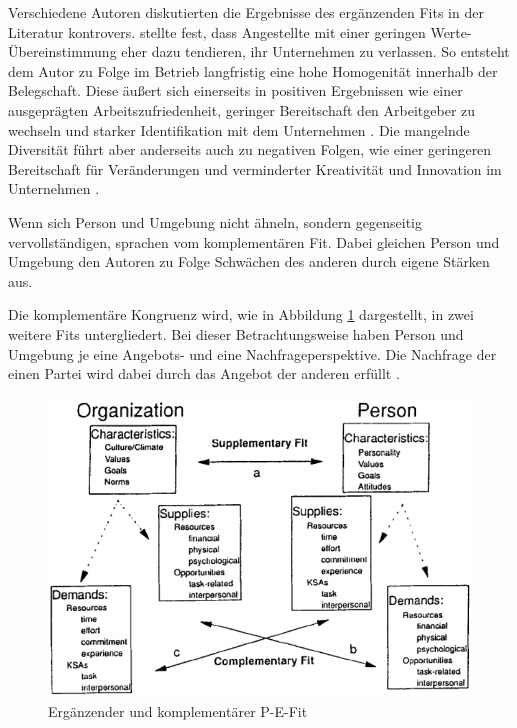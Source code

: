 Verschiedene Autoren diskutierten die Ergebnisse des ergänzenden Fits in der Literatur kontrovers. \textcite[S. 6]{schneider:1987} stellte fest, dass Angestellte mit einer geringen Werte-Übereinstimmung eher dazu tendieren, ihr Unternehmen zu verlassen. So entsteht dem Autor zu Folge im Betrieb langfristig eine hohe Homogenität innerhalb der Belegschaft. Diese äußert sich einerseits in positiven Ergebnissen wie einer ausgeprägten Arbeitszufriedenheit, geringer Bereitschaft den Arbeitgeber zu wechseln und starker Identifikation mit dem Unternehmen \cite[S. 25ff.]{kristof:1996}\cite[S. 5]{su:2015}. Die mangelnde Diversität führt aber anderseits auch zu negativen Folgen, wie einer geringeren Bereitschaft für Veränderungen \cite[S. 10]{schneider:1987} und verminderter Kreativität und Innovation im Unternehmen \cite[S. 7]{chatman:1998}.

Wenn sich Person und Umgebung nicht ähneln, sondern gegenseitig vervollständigen, sprachen \textcite[S. 4]{muchinsky:1987} vom komplementären Fit. Dabei gleichen Person und Umgebung den Autoren zu Folge Schwächen des anderen durch eigene Stärken aus.

Die komplementäre Kongruenz wird, wie in Abbildung \ref{fig:personEnvironmentFit:supplementaryUndComplementary:abb1} dargestellt, in zwei weitere Fits untergliedert. Bei dieser Betrachtungsweise haben Person und Umgebung je eine Angebots- und eine Nachfrageperspektive. Die Nachfrage der einen Partei wird dabei durch das Angebot der anderen erfüllt \cite[S. 2ff.]{caplan:1987}\cite[S. 2f.]{edwards:1991}\cite[S. 2]{copingAndAdaption:1974}.

\begin{figure}[h]
	\centering
	\includegraphics[width=1\textwidth]{gfx/supplementaryComplementaryFit.png}
	\caption{Ergänzender und komplementärer P-E-Fit \cite[S. 4]{kristof:1996}}
	\label{fig:personEnvironmentFit:supplementaryUndComplementary:abb1}
\end{figure}

